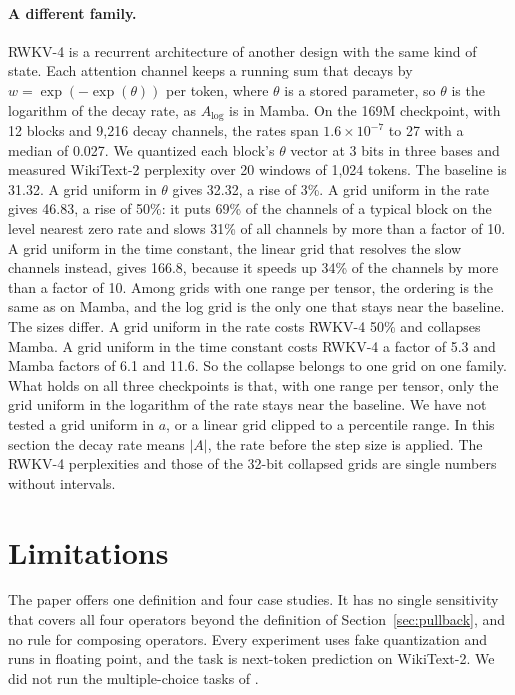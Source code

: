 \documentclass[journal]{IEEEtran}
\begin{document}
\paragraph{A different family.} RWKV-4 \citep{peng2023rwkv} is a recurrent architecture of
another design with the same kind of state. Each attention channel keeps a running sum that
decays by $w = \exp(-\exp(\theta))$ per token, where $\theta$ is a stored parameter, so $\theta$
is the logarithm of the decay rate, as $A_{\log}$ is in Mamba. On the 169M checkpoint, with 12
blocks and 9{,}216 decay channels, the rates span $1.6\times10^{-7}$ to 27 with a median of
0.027. We quantized each block's $\theta$ vector at 3 bits in three bases and measured WikiText-2
perplexity over 20 windows of 1{,}024 tokens. The baseline is 31.32. A grid uniform in $\theta$
gives 32.32, a rise of 3\%. A grid uniform in the rate gives 46.83, a rise of 50\%: it puts 69\%
of the channels of a typical block on the level nearest zero rate and slows 31\% of all channels
by more than a factor of 10. A grid uniform in the time constant, the linear grid that resolves
the slow channels instead, gives 166.8, because it speeds up 34\% of the channels by more than a
factor of 10. Among grids with one range per tensor, the ordering is the same as on Mamba, and the log
grid is the only one that stays near the baseline. The sizes differ. A grid uniform in the rate
costs RWKV-4 50\% and collapses Mamba. A grid uniform in the time constant costs RWKV-4 a factor
of 5.3 and Mamba factors of 6.1 and 11.6. So the collapse belongs to one grid on one family.
What holds on all three checkpoints is that, with one range per tensor, only the grid uniform in
the logarithm of the rate stays near the baseline. We have not tested a grid uniform in $a$, or a linear grid clipped to a percentile range. In
this section the decay rate means $|A|$, the rate before the step size is applied. The
RWKV-4 perplexities and those of the 32-bit collapsed grids are single numbers without intervals.

\section{Limitations}\label{sec:limits}

The paper offers one definition and four case studies. It has no single sensitivity that covers
all four operators beyond the definition of Section~\ref{sec:pullback}, and no rule for composing
operators. Every experiment uses fake quantization and runs in floating point, and the task is
next-token prediction on WikiText-2. We did not run the multiple-choice tasks of
\citet{rababah2026illusion}.
\end{document}
